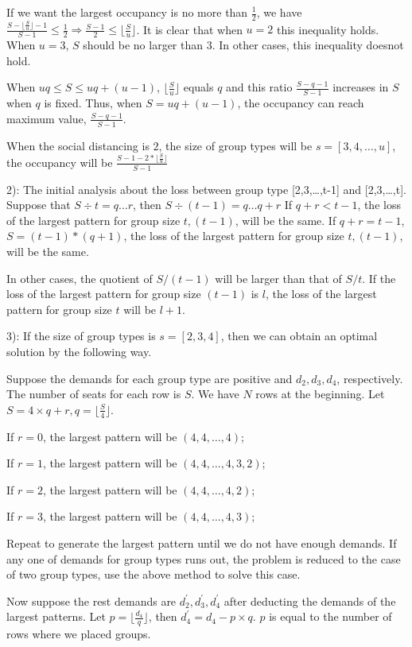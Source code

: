 If we want the largest occupancy is no more than $\frac{1}{2}$, we have $\frac{S-\lfloor \frac{S}{u} \rfloor -1}{S-1} \leq \frac{1}{2} \Rightarrow \frac{S-1}{2} \leq \lfloor \frac{S}{u} \rfloor$. It is clear that when $u =2$ this inequality holds. When $u =3$, $S$ should be no larger than 3. In other cases, this inequality doesnot hold.

When $uq \leq S \leq uq + (u-1)$, $\lfloor \frac{S}{u} \rfloor$ equals $q$ and this ratio $\frac{S-q-1}{S-1}$ increases in $S$ when $q$ is fixed. Thus, when $S = uq + (u-1)$, the occupancy can reach maximum value, $\frac{S-q-1}{S-1}$.

When the social distancing is $2$, the size of group types will be $s = [3,4,\ldots,u]$, the occupancy will be $\frac{S-1-2*\lfloor \frac{S}{u} \rfloor}{S-1}$


2): The initial analysis about the loss between group type [2,3,\ldots,t-1] and [2,3,\ldots,t].
Suppose that $S \div t = q \ldots r$, then $S \div (t-1) = q \ldots q+r$
If $q+r < t-1$, the loss of the largest pattern for group size $t,(t-1)$, will be the same.
If $q+r = t-1$, $S = (t-1)* (q+1)$, the loss of the largest pattern for group size $t,(t-1)$, will be the same.

In other cases, the quotient of $S/(t-1)$ will be larger than that of $S/t$.
If the loss of the largest pattern for group size $(t-1)$ is $l$, the loss of the largest pattern for group size $t$ will be $l+1$.

3): If the size of group types is $s = [2,3,4]$, then we can obtain an optimal solution by the following way.

Suppose the demands for each group type are positive and $d_2,d_3,d_4$, respectively. The number of seats for each row is $S$. We have $N$ rows at the beginning. Let $S = 4 \times q +r, q = \lfloor \frac{S}{4} \rfloor$.

If $r = 0$, the largest pattern will be $(4,4,\ldots,4)$;

If $r = 1$, the largest pattern will be $(4,4,\ldots,4,3,2)$;

If $r = 2$, the largest pattern will be $(4,4,\ldots,4,2)$;

If $r = 3$, the largest pattern will be $(4,4,\ldots,4,3)$;

Repeat to generate the largest pattern until we do not have enough demands.
If any one of demands for group types runs out, the problem is reduced to the case of two group types, use the above method to solve this case.

Now suppose the rest demands are $d_2^{'},d_3^{'},d_4^{'}$ after deducting the demands of the largest patterns. Let $p = \lfloor \frac{d_4}{q} \rfloor$, then $d_4^{'} = d_4 - p \times q$. $p$ is equal to the number of rows where we placed groups.

